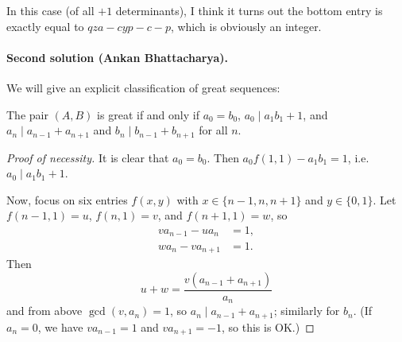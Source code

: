 \begin{remark*}
  In this case (of all $+1$ determinants),
  I think it turns out the bottom entry is
  exactly equal to $qza - cyp - c - p$,
  which is obviously an integer.
\end{remark*}


\paragraph{Second solution (Ankan Bhattacharya).}
We will give an explicit classification of great sequences:
\begin{lemma*}
  The pair $(A,B)$ is great if and only if
  $a_0 = b_0$, $a_0 \mid a_1b_1 + 1$, and
  $a_n \mid a_{n-1} + a_{n+1}$ and $b_n \mid b_{n-1} + b_{n+1}$ for all $n$.
\end{lemma*}
\begin{proof}[Proof of necessity]
  It is clear that $a_0 = b_0$.
  Then $a_0f(1, 1) - a_1b_1 = 1$,
  i.e. $a_0 \mid a_1b_1 + 1$.

  Now, focus on six entries $f(x, y)$
  with $x \in \{n-1, n, n+1\}$ and $y \in \{0, 1\}$.
  Let $f(n-1, 1) = u$, $f(n, 1) = v$, and $f(n+1, 1) = w$, so
  \begin{align*}
    v a_{n-1} - u a_n & = 1,\\
    w a_n - v a_{n+1} & = 1.
  \end{align*}
  Then
  \[u + w = \frac{v(a_{n-1} + a_{n+1})}{a_n}\]
  and from above $\gcd(v, a_n) = 1$,
  so $a_n \mid a_{n-1} + a_{n+1}$;
  similarly for $b_n$.
  (If $a_n = 0$,
  we have $va_{n-1} = 1$ and $va_{n+1} = -1$,
  so this is OK.)
\end{proof}

